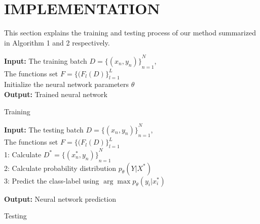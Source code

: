 \documentclass[12pt,a4paper]{article}
\begin{document}
\newpage
\section{\uppercase{IMPLEMENTATION}}
This section explains the training and testing process of our
method summarized in Algorithm 1 and 2 respectively.

\begin{algorithm}[!h]
\SetAlgoLined
 \textbf{Input:} The training batch \begin{math} D = {\{ (x_n,y_n) \}}_{n=1}^N\end{math}, \\
 \quad \quad \quad The functions set \begin{math}F = {\{ (F_l(D) \}}_{l=1}^L\end{math} \\
 Initialize the neural network parameters \textbf{$\theta$} \\
 \textbf{Output:} Trained neural network %
 \caption{Training\vspace{-5mm}}
\end{algorithm}

\begin{algorithm}[!h]
\SetAlgoLined
 \textbf{Input:} The testing batch \begin{math} D = {\{ (x_n,y_n) \}}_{n=1}^N\end{math}, \\
 \quad \quad \quad The functions set \begin{math}F = {\{ (F_l(D) \}}_{l=1}^L\end{math} \\
 1: Calculate \begin{math} D^* = {\{ (x_n^*,y_n) \}}_{n=1}^N\end{math}\\
2: Calculate probability distribution $p_\theta(Y|X^*)$\\
3: Predict the class-label using $\arg \max p_\theta(y_i|x_i^*)$

\textbf{Output:} Neural network prediction
\caption{Testing}
\end{algorithm}
\end{document}
